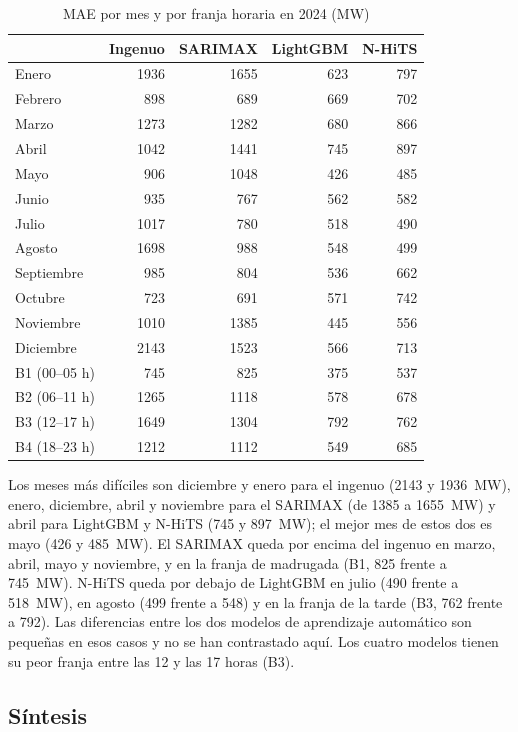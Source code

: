\begin{table}[H]
	\centering
	\caption{MAE por mes y por franja horaria en 2024 (MW)}
	\label{tab:final-mes}
	\small
	\begin{tabular}{lrrrr}
		\hline
		 & \textbf{Ingenuo} & \textbf{SARIMAX} & \textbf{LightGBM} & \textbf{N-HiTS} \\
		\hline
		Enero & 1936 & 1655 & 623 & 797 \\
		Febrero & 898 & 689 & 669 & 702 \\
		Marzo & 1273 & 1282 & 680 & 866 \\
		Abril & 1042 & 1441 & 745 & 897 \\
		Mayo & 906 & 1048 & 426 & 485 \\
		Junio & 935 & 767 & 562 & 582 \\
		Julio & 1017 & 780 & 518 & 490 \\
		Agosto & 1698 & 988 & 548 & 499 \\
		Septiembre & 985 & 804 & 536 & 662 \\
		Octubre & 723 & 691 & 571 & 742 \\
		Noviembre & 1010 & 1385 & 445 & 556 \\
		Diciembre & 2143 & 1523 & 566 & 713 \\
		\hline
		B1 (00--05 h) & 745 & 825 & 375 & 537 \\
		B2 (06--11 h) & 1265 & 1118 & 578 & 678 \\
		B3 (12--17 h) & 1649 & 1304 & 792 & 762 \\
		B4 (18--23 h) & 1212 & 1112 & 549 & 685 \\
		\hline
	\end{tabular}
\end{table}


Los meses más difíciles son diciembre y enero para el ingenuo (2143 y
1936~MW), enero, diciembre, abril y noviembre para el SARIMAX (de 1385 a
1655~MW) y abril para LightGBM y N-HiTS (745 y 897~MW); el mejor mes de estos
dos es mayo (426 y 485~MW). El SARIMAX queda
por encima del ingenuo en marzo, abril, mayo y noviembre, y en la franja de
madrugada (B1, 825 frente a 745~MW). N-HiTS queda por debajo de LightGBM en
julio (490 frente a 518~MW), en agosto (499 frente a 548) y en la franja de la
tarde (B3, 762 frente a 792). Las diferencias entre los dos modelos de
aprendizaje automático son pequeñas en esos casos y no se han contrastado
aquí. Los cuatro modelos tienen su peor franja entre las 12 y las 17 horas (B3).

\subsection{Síntesis}\label{sec:final-sintesis}

